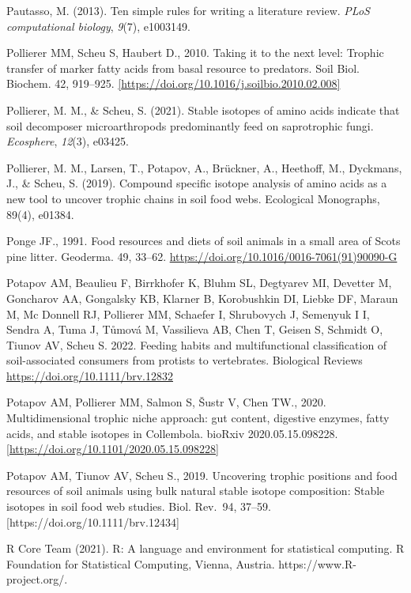 \documentclass[10pt,oneside]{article}
\begin{document}
Pautasso, M. (2013). Ten simple rules for writing a literature review.
\emph{PLoS computational biology}, \emph{9}(7), e1003149.

Pollierer MM, Scheu S, Haubert D., 2010. Taking it to the next level:
Trophic transfer of marker fatty acids from basal resource to predators.
Soil Biol. Biochem. 42, 919--925.
\href{https://doi.org/10.1016/j.soilbio.2010.02.008}{{[}https://doi.org/10.1016/j.soilbio.2010.02.008{]}}

Pollierer, M. M., \& Scheu, S. (2021). Stable isotopes of amino acids
indicate that soil decomposer microarthropods predominantly feed on
saprotrophic fungi. \emph{Ecosphere}, \emph{12}(3), e03425.

Pollierer, M. M., Larsen, T., Potapov, A., Brückner, A., Heethoff, M.,
Dyckmans, J., \& Scheu, S. (2019). Compound specific isotope analysis of
amino acids as a new tool to uncover trophic chains in soil food webs.
Ecological Monographs, 89(4), e01384.

Ponge JF., 1991. Food resources and diets of soil animals in a small
area of Scots pine litter. Geoderma. 49, 33--62.
\url{https://doi.org/10.1016/0016-7061(91)90090-G}

Potapov AM, Beaulieu F, Birrkhofer K, Bluhm SL, Degtyarev MI, Devetter
M, Goncharov AA, Gongalsky KB, Klarner B, Korobushkin DI, Liebke DF,
Maraun M, Mc Donnell RJ, Pollierer MM, Schaefer I, Shrubovych J,
Semenyuk I I, Sendra A, Tuma J, Tůmová M, Vassilieva AB, Chen T, Geisen
S, Schmidt O, Tiunov AV, Scheu S. 2022. Feeding habits and
multifunctional classification of soil-associated consumers from
protists to vertebrates. Biological Reviews
\url{https://doi.org/10.1111/brv.12832}

Potapov AM, Pollierer MM, Salmon S, Šustr V, Chen TW., 2020.
Multidimensional trophic niche approach: gut content, digestive enzymes,
fatty acids, and stable isotopes in Collembola. bioRxiv
2020.05.15.098228.
\href{https://doi.org/10.1101/2020.05.15.098228}{{[}https://doi.org/10.1101/2020.05.15.098228{]}}

Potapov AM, Tiunov AV, Scheu S., 2019. Uncovering trophic positions and
food resources of soil animals using bulk natural stable isotope
composition: Stable isotopes in soil food web studies. Biol. Rev.~94,
37--59. {[}https://doi.org/10.1111/brv.12434{]}

R Core Team (2021). R: A language and environment for statistical
computing. R Foundation for Statistical Computing, Vienna, Austria.
https://www.R-project.org/.
\end{document}
